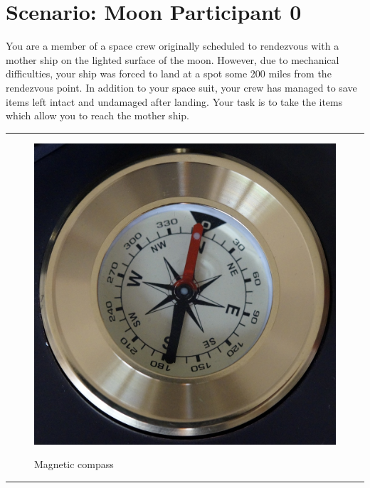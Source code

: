 \documentclass{article}
\begin{document}
    \section*{Scenario: \textmd{Moon} \hfill Participant \textmd{0}}
    \Large You are a member of a space crew originally scheduled to rendezvous with a mother ship on the lighted surface of the moon. However, due to mechanical difficulties, your ship was forced to land at a spot some 200 miles from the rendezvous point. In addition to your space suit, your crew has managed to save items left intact and undamaged after landing. Your task is to take the items which allow you to reach the mother ship.
\clearpage
        \par\noindent\rule{\textwidth}{0.4pt}
    \begin{figure}[H]
        \centering
        \begin{minipage}{0.25\textwidth}
            \centering
            \includegraphics[width=\textwidth]{../SurvivalItemImages/compass}
        \end{minipage}\hfill
        \begin{minipage}{0.7\textwidth}
            \centering
            \Large Magnetic compass
        \end{minipage}
    \end{figure}
    \vspace{-0.8em}
    \noindent\rule{\textwidth}{0.4pt}
            
\end{document}
